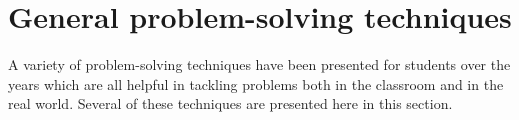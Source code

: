 









































\filbreak
\section{General problem-solving techniques}

A variety of problem-solving techniques have been presented for students over the years which are all helpful in tackling problems both in the classroom and in the real world.  Several of these techniques are presented here in this section.





